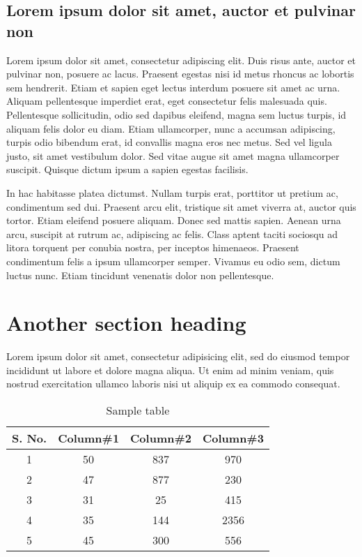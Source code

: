 \subsection{Lorem ipsum dolor sit amet, auctor et pulvinar non}
Lorem ipsum dolor sit amet, consectetur adipiscing elit. Duis risus ante, auctor et pulvinar non, posuere ac lacus. Praesent egestas nisi id metus rhoncus ac lobortis sem hendrerit. Etiam et sapien eget lectus interdum posuere sit amet ac urna. Aliquam pellentesque imperdiet erat, eget consectetur felis malesuada quis. Pellentesque sollicitudin, odio sed dapibus eleifend, magna sem luctus turpis, id aliquam felis dolor eu diam. Etiam ullamcorper, nunc a accumsan adipiscing, turpis odio bibendum erat, id convallis magna eros nec metus. Sed vel ligula justo, sit amet vestibulum dolor. Sed vitae augue sit amet magna ullamcorper suscipit. Quisque dictum ipsum a sapien egestas facilisis.

In hac habitasse platea dictumst. Nullam turpis erat, porttitor ut pretium ac, condimentum sed dui. Praesent arcu elit, tristique sit amet viverra at, auctor quis tortor. Etiam eleifend posuere aliquam. Donec sed mattis sapien. Aenean urna arcu, suscipit at rutrum ac, adipiscing ac felis. Class aptent taciti sociosqu ad litora torquent per conubia nostra, per inceptos himenaeos. Praesent condimentum felis a ipsum ullamcorper semper. Vivamus eu odio sem, dictum luctus nunc. Etiam tincidunt venenatis dolor non pellentesque. 


\section{Another section heading}
Lorem ipsum dolor sit amet, consectetur adipisicing elit, sed do eiusmod tempor incididunt ut labore et dolore magna aliqua. Ut enim ad minim veniam, quis nostrud exercitation ullamco laboris nisi ut aliquip ex ea commodo consequat.

\begin{table}[ht]
\caption{Sample table} %
\centering %
\begin{tabular}{c c c c}
\hline\hline %
S. No. & Column\#1 & Column\#2 & Column\#3 \\ [0.5ex]
\hline %
1 & 50 & 837 & 970 \\
2 & 47 & 877 & 230 \\
3 & 31 & 25 & 415 \\
4 & 35 & 144 & 2356 \\
5 & 45 & 300 & 556 \\ [1ex] %
\hline %
\end{tabular}
\label{table:nonlin} %
\end{table}

